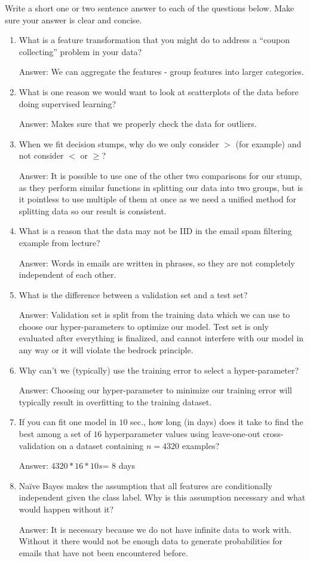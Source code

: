 \documentclass{article}
\def\ans#1{\par\gre{Answer: #1}}
\def\blu#1{{\color{blu}#1}}
\def\gre#1{{\color{gre}#1}}
\def\enum#1{\begin{enumerate}#1\end{enumerate}}
\begin{document}
\blu{Write a short one or two sentence answer to each of the questions below}. Make sure your answer is clear and concise.

\enum{
 \item What is a feature transformation that you might do to address a ``coupon collecting'' problem in your data?
 \ans{We can aggregate the features - group features into larger categories. }
\item What is one reason we would want to look at scatterplots of the data before doing supervised learning?
\ans{Makes sure that we properly check the data for outliers.}
 \item When we fit decision stumps, why do we only consider $>$ (for example) and not consider $<$ or $\geq$?
 \ans{It is possible to use one of the other two comparisons for our stump, as they perform similar functions in splitting our data into two groups, but is it pointless to use multiple of them at once as we need a unified method for splitting data so our result is consistent.}
\item What is a reason that the data may not be IID in the email spam filtering example from lecture?
\ans{Words in emails are written in phrases, so they are not completely independent of each other.}
\item What is the difference between a validation set and a test set?
\ans{Validation set is split from the training data which we can use to choose our hyper-parameters to optimize our model. Test set is only evaluated after everything is finalized, and cannot interfere with our model in any way or it will violate the bedrock principle.}
\item Why can't we (typically) use the training error to select a hyper-parameter?
\ans{Choosing our hyper-parameter to minimize our training error will typically result in overfitting to the training dataset.}
\item If you can fit one model in $10$ sec., how long (in days) does it take to find the best among a set of $16$ hyperparameter values using leave-one-out cross-validation on a dataset containing $n=4320$ examples?
\ans{$4320*16*10s$= 8 days}
\item{Na{\"i}ve Bayes makes the assumption that all features are conditionally independent given the class label. Why is this assumption necessary and what would happen without it?}
\ans{It is necessary because we do not have infinite data to work with. Without it there would not be enough data to generate probabilities for emails that have not been encountered before.}
}
\end{document}
